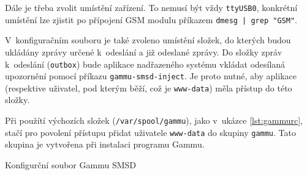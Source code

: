 Dále je třeba zvolit umístění zařízení. To nemusí být vždy \texttt{ttyUSB0}, konkrétní umístění lze zjistit po přípojení GSM modulu příkazem \texttt{dmesg | grep "GSM"}.

V~konfiguračním souboru je také zvoleno umístění složek, do kterých budou ukládány zprávy určené k~odeslání a již odeslané zprávy. Do složky zpráv k~odeslání (\texttt{outbox}) bude aplikace nadřazeného systému vkládat odesílaná upozornění pomocí příkazu \texttt{gammu-smsd-inject}. Je proto nutné, aby aplikace (respektive uživatel, pod kterým běží, což je \texttt{www-data}) měla přístup do této složky.

Při použítí výchozích složek (\texttt{/var/spool/gammu}), jako v~ukázce \ref{lst:gammurc}, stačí pro povolení přístupu přidat uživatele \texttt{www-data} do skupiny \texttt{gammu}. Tato skupina je vytvořena při instalaci programu Gammu.

\begin{listing}[htbp]
\caption{\label{lst:gammurc} Konfigurční soubor Gammu SMSD}
\inputminted[bgcolor=codebg]{ini}{source-samples/gammurc}
\end{listing}
